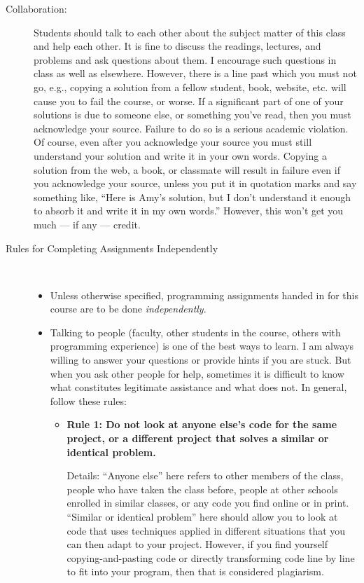 \documentclass [letterpaper,11pt]{article}
\begin{document}
\begin{description}
\begin{itemize}
     \end{itemize}


\item[Collaboration:]
Students should talk to each other about the subject matter of this class and help each other.  It is fine to discuss the readings, lectures, and problems and ask questions about them. I encourage such questions in class as well as elsewhere. However, there is a line past which you must not go, e.g., copying a solution from a fellow student, book, website, etc. will cause you to fail the course, or worse. If a significant part of one of your solutions is due to someone else, or something you've read, then you must acknowledge your source. Failure to do so is a serious academic violation. Of course, even after you acknowledge your source you must still understand your solution and write it in your own words. Copying a solution from the web, a book, or classmate will result in failure even if you acknowledge your source, unless you put it in quotation marks and say something like, ``Here is Amy's solution, but I don't understand it enough to absorb it and write it in my own words.'' However, this won't get you much --- if any --- credit. 

\item[Rules for Completing Assignments Independently]\
\begin{itemize}
        \item Unless otherwise specified, programming assignments handed in for this course are to be done \emph{independently}.  
        \item Talking to people (faculty, other students in the course, others with programming experience) is one of the best ways to learn.  I am always willing to answer your questions or provide hints if you are stuck.  But when you ask other people for help, sometimes
        it is difficult to know what constitutes legitimate assistance and what does not.  In general, follow these rules:
        
        \begin{itemize}
                \item \textbf{Rule 1: Do not look at anyone else's code for the same project, or a different project that solves a similar 
                or identical problem.}
                
                Details: ``Anyone else'' here refers to other members of the class, people who have taken the class before, people at other
                schools enrolled in similar classes, or any code you find online or in print.  ``Similar or identical problem'' here should 
                allow you to look at code that uses techniques applied in different situations that you can then 
                adapt to your project.  However, if you find yourself copying-and-pasting code or directly transforming
                code line by line to fit into your program, then that is considered plagiarism.
                

\end{itemize}
\end{itemize}
\end{description}
\end{document}
